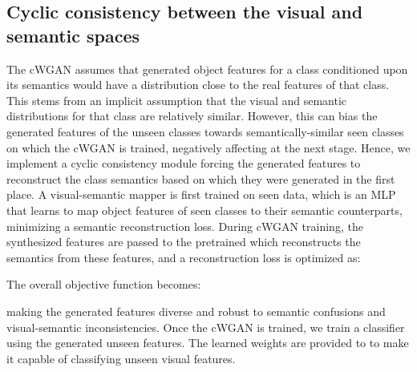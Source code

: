 \documentclass{bmvc2k}
\begin{document}
\subsection{Cyclic consistency between the visual and semantic spaces}
\label{sec:cyc-con}
The cWGAN assumes that generated object features for a class conditioned upon its semantics would have a distribution close to the real features of that class. This stems from an implicit assumption that the visual and semantic distributions for that class are relatively similar. However, this can bias the generated features of the unseen classes towards semantically-similar seen classes on which the cWGAN is trained, negatively affecting  at the next stage. 
Hence, we implement a cyclic consistency module forcing the generated features to reconstruct the class semantics based on which they were generated in the first place. A visual-semantic mapper  is first trained on seen data, which is an MLP that learns to map object features of seen classes to their semantic counterparts, minimizing a semantic reconstruction loss.
During cWGAN training, the synthesized features are passed to the pretrained  which reconstructs the semantics from these features, and a reconstruction loss is optimized as:



The overall objective function becomes:

making the generated features diverse and robust to semantic confusions and visual-semantic inconsistencies. Once the cWGAN is trained, we train a classifier  using the generated unseen features. The learned weights are provided to  to make it capable of classifying unseen visual features.
\end{document}
